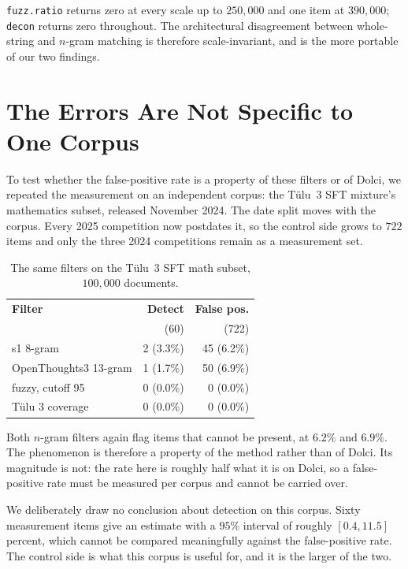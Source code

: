 \documentclass[11pt]{article}
\begin{document}
\texttt{fuzz.ratio} returns zero at every scale up to $250{,}000$ and one item at
$390{,}000$; \texttt{decon} returns zero throughout. The architectural
disagreement between whole-string and $n$-gram matching is therefore
scale-invariant, and is the more portable of our two findings.

\section{The Errors Are Not Specific to One Corpus}
\label{sec:second}

To test whether the false-positive rate is a property of these filters or of
Dolci, we repeated the measurement on an independent corpus: the T\"{u}lu~3 SFT
mixture's mathematics subset, released November 2024. The date split moves with
the corpus. Every 2025 competition now postdates it, so the control side grows to
$722$ items and only the three 2024 competitions remain as a measurement set.

\begin{table}[h]
\centering
\small
\setlength{\tabcolsep}{3.5pt}
\begin{tabular}{lrr}
\toprule
\textbf{Filter} & \textbf{Detect} & \textbf{False pos.} \\
 & (60) & (722) \\
\midrule
s1 8-gram             & 2 (3.3\%) & 45 (6.2\%) \\
OpenThoughts3 13-gram & 1 (1.7\%) & 50 (6.9\%) \\
fuzzy, cutoff 95 & 0 (0.0\%) & 0 (0.0\%) \\
T\"{u}lu 3 coverage         & 0 (0.0\%) & 0 (0.0\%) \\
\bottomrule
\end{tabular}
\caption{The same filters on the T\"{u}lu~3 SFT math subset, $100{,}000$ documents.}
\label{tab:second}
\end{table}

Both $n$-gram filters again flag items that cannot be present, at $6.2\%$ and
$6.9\%$. The phenomenon is therefore a property of the method rather than of
Dolci. Its magnitude is not: the rate here is roughly half what it is on Dolci,
so a false-positive rate must be measured per corpus and cannot be carried over.

We deliberately draw no conclusion about detection on this corpus. Sixty
measurement items give an estimate with a $95\%$ interval of roughly $[0.4, 11.5]$
percent, which cannot be compared meaningfully against the false-positive rate.
The control side is what this corpus is useful for, and it is the larger of the
two.
\end{document}
